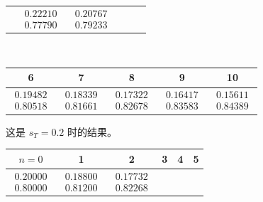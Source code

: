 \begin{exercises}
\begin{answer}
\begin{exparts}
\begin{center}
\begin{tabular}{c|ccccc}
               &$\begin{array}{c}  0.22210 \\ 0.77790 \end{array}$
               &$\begin{array}{c}  0.20767 \\ 0.79233 \end{array}$
             \end{tabular}                                     \\[1ex]
             \begin{tabular}{|ccccc}
               6  &7  &8  &9 &10 \\ 
               \hline
               $\begin{array}{c}  0.19482 \\ 0.80518 \end{array}$
               &$\begin{array}{c}  0.18339 \\ 0.81661 \end{array}$
               &$\begin{array}{c}  0.17322 \\ 0.82678 \end{array}$
               &$\begin{array}{c}  0.16417 \\ 0.83583 \end{array}$
               &$\begin{array}{c}  0.15611 \\ 0.84389 \end{array}$
             \end{tabular}
           \end{center}
         \partsitem 这是 $s_T=0.2$ 时的结果。
           \begin{center}
             \begin{tabular}{c|ccccc}
               $n=0$ &1  &2  &3  &4  &5  \\ 
               \hline
               $\begin{array}{c}  0.20000 \\ 0.80000 \end{array}$
               &$\begin{array}{c}   0.18800 \\ 0.81200 \end{array}$
               &$\begin{array}{c}   0.17732 \\ 0.82268 \end{array}$

\end{tabular}
\end{center}
\end{exparts}
\end{answer}
\end{exercises}
